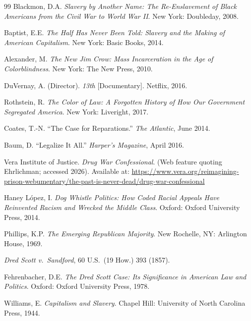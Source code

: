 \documentclass[12pt,openany]{book}
\begin{document}
\begin{thebibliography}{99}
Blackmon, D.A. \textit{Slavery by Another Name: The Re-Enslavement of Black Americans from the Civil War to World War II}. New York: Doubleday, 2008.

Baptist, E.E. \textit{The Half Has Never Been Told: Slavery and the Making of American Capitalism}. New York: Basic Books, 2014.

Alexander, M. \textit{The New Jim Crow: Mass Incarceration in the Age of Colorblindness}. New York: The New Press, 2010.

DuVernay, A. (Director). \textit{13th} [Documentary]. Netflix, 2016.


Rothstein, R. \textit{The Color of Law: A Forgotten History of How Our Government Segregated America}. New York: Liveright, 2017.

Coates, T.-N. ``The Case for Reparations.'' \textit{The Atlantic}, June 2014.


Baum, D. ``Legalize It All.'' \textit{Harper's Magazine}, April 2016.

Vera Institute of Justice. \textit{Drug War Confessional}. (Web feature quoting Ehrlichman; accessed 2026). Available at: \url{https://www.vera.org/reimagining-prison-webumentary/the-past-is-never-dead/drug-war-confessional}

Haney L\'{o}pez, I. \textit{Dog Whistle Politics: How Coded Racial Appeals Have Reinvented Racism and Wrecked the Middle Class}. Oxford: Oxford University Press, 2014.

Phillips, K.P. \textit{The Emerging Republican Majority}. New Rochelle, NY: Arlington House, 1969.


\textit{Dred Scott v.\ Sandford}, 60 U.S.\ (19 How.) 393 (1857).

Fehrenbacher, D.E. \textit{The Dred Scott Case: Its Significance in American Law and Politics}. Oxford: Oxford University Press, 1978.


Williams, E. \textit{Capitalism and Slavery}. Chapel Hill: University of North Carolina Press, 1944.


\end{thebibliography}
\end{document}
